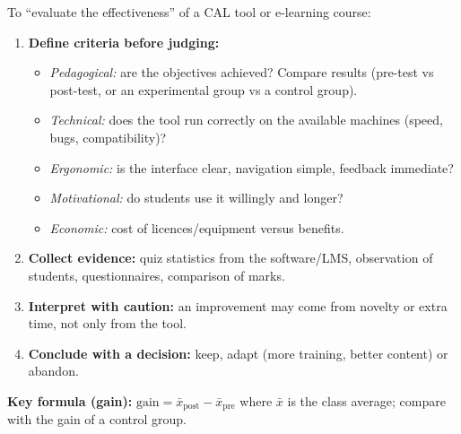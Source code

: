 \documentclass[11pt]{article}
\begin{document}
\begin{methode}
To ``evaluate the effectiveness'' of a CAL tool or e-learning course:
\begin{enumerate}
\item \textbf{Define criteria before judging:}
\begin{itemize}
\item \emph{Pedagogical:} are the objectives achieved? Compare results (pre-test vs post-test, or an experimental group vs a control group).
\item \emph{Technical:} does the tool run correctly on the available machines (speed, bugs, compatibility)?
\item \emph{Ergonomic:} is the interface clear, navigation simple, feedback immediate?
\item \emph{Motivational:} do students use it willingly and longer?
\item \emph{Economic:} cost of licences/equipment versus benefits.
\end{itemize}
\item \textbf{Collect evidence:} quiz statistics from the software/LMS, observation of students, questionnaires, comparison of marks.
\item \textbf{Interpret with caution:} an improvement may come from novelty or extra time, not only from the tool.
\item \textbf{Conclude with a decision:} keep, adapt (more training, better content) or abandon.
\end{enumerate}
\textbf{Key formula (gain):} $\text{gain} = \bar{x}_{\text{post}} - \bar{x}_{\text{pre}}$ where $\bar{x}$ is the class average; compare with the gain of a control group.
\end{methode}
\end{document}
